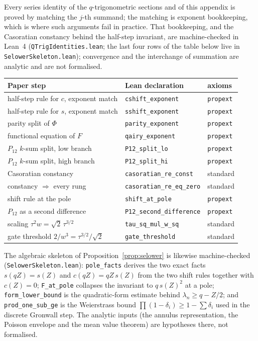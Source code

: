 \documentclass[11pt]{article}
\theoremstyle{plain}
\theoremstyle{definition}
\theoremstyle{remark}
\begin{document}
Every series identity of the $q$-trigonometric sections and of this appendix is proved by
matching the $j$-th summand; the matching is exponent bookkeeping, which is where such arguments
fail in practice. That bookkeeping, and the Casoratian constancy behind the half-step invariant,
are machine-checked in Lean~4 (\texttt{QTrigIdentities.lean}; the last four rows of the table
below live in \texttt{SelowerSkeleton.lean}); convergence and the interchange of summation are
analytic and are not formalised.

\begin{center}\small
\begin{tabular}{lll}
\hline
Paper step & Lean declaration & axioms \\
\hline
half-step rule for $c$, exponent match & \texttt{cshift\_exponent} & \texttt{propext}\\
half-step rule for $s$, exponent match & \texttt{sshift\_exponent} & \texttt{propext}\\
parity split of $\Phi$ & \texttt{parity\_exponent} & \texttt{propext}\\
functional equation of $F$ & \texttt{qairy\_exponent} & \texttt{propext}\\
$P_{12}$ $k$-sum split, low branch & \texttt{P12\_split\_lo} & \texttt{propext}\\
$P_{12}$ $k$-sum split, high branch & \texttt{P12\_split\_hi} & \texttt{propext}\\
Casoratian constancy & \texttt{casoratian\_re\_const} & standard\\
constancy $\Rightarrow$ every rung & \texttt{casoratian\_re\_eq\_zero} & standard\\
shift rule at the pole & \texttt{shift\_at\_pole} & \texttt{propext}\\
$P_{12}$ as a second difference & \texttt{P12\_second\_difference} & \texttt{propext}\\
scaling $\tau^2w=\sqrt2\,\tau^{3/2}$ & \texttt{tau\_sq\_mul\_w\_sq} & standard\\
gate threshold $2/w^3=\tau^{3/2}/\sqrt2$ & \texttt{gate\_threshold} & standard\\
\hline
\end{tabular}
\end{center}

The algebraic skeleton of Proposition~\ref{prop:selower} is likewise machine-checked
(\texttt{SelowerSkeleton.lean}): \texttt{pole\_facts} derives the two exact facts
$s(qZ)=s(Z)$ and $c(qZ)=qZ\,s(Z)$ from the two shift rules together with $c(Z)=0$;
\texttt{F\_at\_pole} collapses the invariant to $q\,s(Z)^2$ at a pole;
\texttt{form\_lower\_bound} is the quadratic-form estimate behind $\lambda_n\ge q-Z/2$; and
\texttt{prod\_one\_sub\_ge} is the Weierstrass bound $\prod(1-\delta_i)\ge1-\sum\delta_i$ used in the
discrete Gronwall step. The analytic inputs (the annulus representation, the Poisson envelope and
the mean value theorem) are hypotheses there, not formalised.
\end{document}

